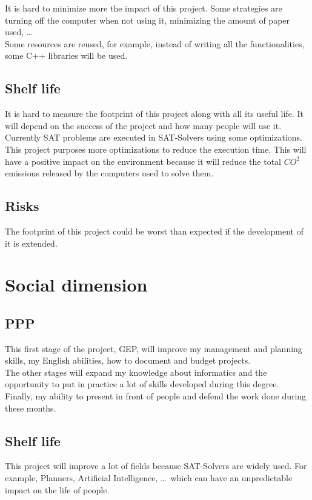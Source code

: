 It is hard to minimize more the impact of this project. Some strategies are turning off the computer when not using it, minimizing the amount of paper used, \ldots\\
Some resources are reused, for example, instead of writing all the functionalities, some C++ libraries will be used.
\subsection{Shelf life}
It is hard to measure the footprint of this project along with all its useful life. It will depend on the success of the project and how many people will use it. \\

Currently SAT problems are executed in SAT-Solvers using some optimizations. This project purposes more optimizations to reduce the execution time. This will have a positive impact on the environment because it will reduce the total $CO^2$ emissions released by the computers used to solve them.
\subsection{Risks} 
The footprint of this project could be worst than expected if the development of it is extended.

\section{Social dimension}
\subsection{PPP}
This first stage of the project, GEP, will improve my management and planning skills, my English abilities, how to document and budget projects.\\
The other stages will expand my knowledge about informatics and the opportunity to put in practice a lot of skills developed during this degree. \\
Finally, my ability to present in front of people and defend the work done during these months.

\subsection{Shelf life}
This project will improve a lot of fields because SAT-Solvers are widely used. For example, Planners, Artificial Intelligence, \ldots \ which can have an unpredictable impact on the life of people.\\

